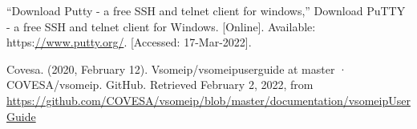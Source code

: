 \documentclass[a4paper, 12pt, oneside, BCOR1cm,toc=chapterentrywithdots]{scrbook}
\begin{document}
\begin{thebibliography}{00}
“Download Putty - a free SSH and telnet client for windows,” Download PuTTY - a free SSH and telnet client for Windows. [Online]. Available: https:\url{//www.putty.org/}. [Accessed: 17-Mar-2022]. 

Covesa. (2020, February 12). Vsomeip/vsomeipuserguide at master · COVESA/vsomeip. GitHub. Retrieved February 2, 2022, from \url{https://github.com/COVESA/vsomeip/blob/master/documentation/vsomeipUserGuide} 

\end{thebibliography}
\end{document}
